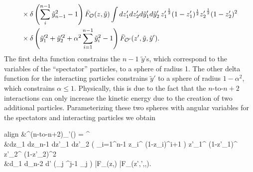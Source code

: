 \begin{subappendices}
\begin{equation}
\begin{aligned}
			&\times \delta\left(\sum_i^{n-1} \tilde{y}^2_{n-1} -1  \right) \bar{F}_{{\cal O}}(z,\tilde{y}) \int dz'_1 dz'_2  d\tilde{y}'_1 d\tilde{y}_2'\, {z'_1}^{\frac{1}{2}} (1-z'_1)^{\frac{1}{2}} {z'_2}^{\frac{1}{2}} (1-z'_2)^2 \\
			&\times \delta\left(\tilde{y}_1^{\prime 2} + \tilde{y}_2^{\prime 2} + \alpha^2 \sum_{i=1}^{n-1} \tilde{y}_i^2 - 1 \right) \bar{F}_{{\cal O}'}(z', \tilde{y},\tilde{y}').
		\end{aligned}
	\end{equation} The first delta function constrains the $n-1$ $\tilde{y}$'s, which correspond to the variables of the ``spectator'' particles, to a sphere of radius 1. The other delta function for the interacting particles constrains $\tilde{y}'$ to a sphere of radius $1-\alpha^2$, which constrains $\alpha \le 1$. Physically, this is due to the fact that the $n$-to-$n+2$ interactions can only increase the kinetic energy due to the creation of two additional particles. Parameterizing these two spheres with angular variables for the spectators and interacting particles we obtain \begin{empheq}[box=\fbox]{align}
			&\Mcal^{(n\textrm{-to-}n+2)}_{\Ocal \Ocal'}(\alpha) =   \alpha^{}  \nonumber \\
			&\times \int dz_1 \dotsb dz_{n-1} dz'_1 dz'_2   \left( \prod_{i=1}^{n-1} z_i^{} (1-z_i)^{i+1} \right) {z'_1}^{} (1-z'_1)^{} {z'_2}^{} (1-z'_2)^2 \nonumber \\
			&\times \int d\theta_1 \dotsb d\theta_{n-2} d\theta' \left(\prod_j \sin^{j-1} \theta_j \right) \bar{F}_{\Ocal}(z,\theta) \bar{F}_{\Ocal}(z',\theta',\theta,\alpha).
		\end{empheq}


\end{subappendices}

